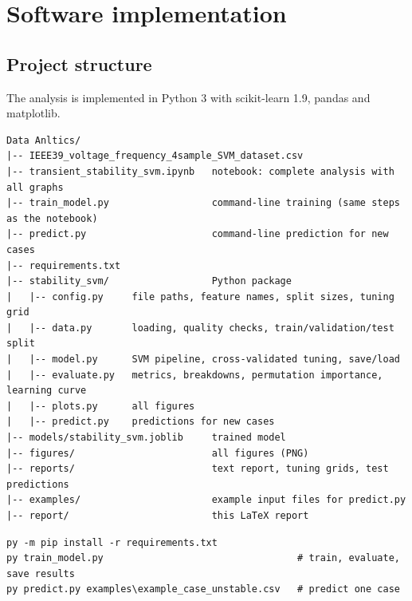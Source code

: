 \documentclass[11pt,a4paper]{article}
\begin{document}
\appendix
\section{Software implementation}
\subsection{Project structure}
The analysis is implemented in Python 3 with scikit-learn 1.9, pandas and matplotlib.
\begin{lstlisting}[language={},numbers=none,caption={Project folder.}]
Data Anltics/
|-- IEEE39_voltage_frequency_4sample_SVM_dataset.csv
|-- transient_stability_svm.ipynb   notebook: complete analysis with all graphs
|-- train_model.py                  command-line training (same steps as the notebook)
|-- predict.py                      command-line prediction for new cases
|-- requirements.txt
|-- stability_svm/                  Python package
|   |-- config.py     file paths, feature names, split sizes, tuning grid
|   |-- data.py       loading, quality checks, train/validation/test split
|   |-- model.py      SVM pipeline, cross-validated tuning, save/load
|   |-- evaluate.py   metrics, breakdowns, permutation importance, learning curve
|   |-- plots.py      all figures
|   |-- predict.py    predictions for new cases
|-- models/stability_svm.joblib     trained model
|-- figures/                        all figures (PNG)
|-- reports/                        text report, tuning grids, test predictions
|-- examples/                       example input files for predict.py
|-- report/                         this LaTeX report
\end{lstlisting}

\begin{lstlisting}[language={},numbers=none,caption={Installing and running.}]
py -m pip install -r requirements.txt
py train_model.py                                  # train, evaluate, save results
py predict.py examples\example_case_unstable.csv   # predict one case
\end{lstlisting}
\end{document}
